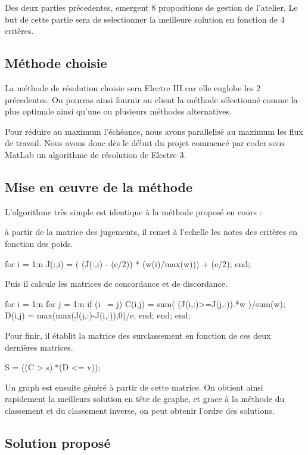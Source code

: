 
Des deux parties précedentes, emergent 8 propositions de gestion de l'atelier.
Le but de cette partie sera de selectionner la meilleure solution en fonction de 4 critères.

\subsection{Méthode choisie}

La méthode de résolution choisie sera Electre III car elle englobe les 2 précedentes.
On pourras ainsi fournir au client la méthode sélectionné comme la plus optimale ainsi qu'une ou plusieurs méthodes alternatives.

Pour réduire au maximum l'échéance, nous avons parallelisé au maximum les flux de travail.
Nous avons donc dès le début du projet commencé par coder sous MatLab un algorithme de résolution de Electre 3.

\subsection{Mise en œuvre de la méthode}

L'algorithme très simple est identique à la méthode proposé en cours :

à partir de la matrice des jugements, il remet à l'echelle les notes des critères en fonction des poids.

for i = 1:n
	J(:,i) = ( (J(:,i) - (e/2)) * (w(i)/max(w))) + (e/2);
end;

Puis il calcule les matrices de concordance et de discordance.

for i = 1:n
    for j = 1:n
        if (i ~= j)
            C(i,j) = sum( (J(i,:)>=J(j,:)).*w )/sum(w);
            D(i,j) = max(max(J(j,:)-J(i,:)),0)/e;
        end;
    end;
end;

Pour finir, il établit la matrice des surclassement en fonction de ces deux dernières matrices.

S = ((C > s).*(D <= v));

Un graph est ensuite généré à partir de cette matrice.
On obtient ainsi rapidement la meilleurs solution en tête de graphe, et grace à la méthode du classement et du classement inverse, on peut obtenir l'ordre des solutions.

\subsection{Solution proposé}

